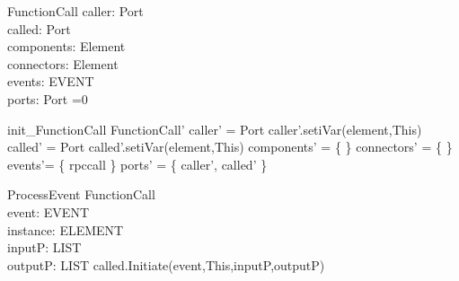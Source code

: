 \begin{schema}{FunctionCall}
caller:  Port \\
called: Port \\
components: \pset Element \\
connectors: \pset Element \\
events: \pset EVENT \\
ports: \pset Port
=0
\end{schema}


\begin{zed}
init\_FunctionCall \sdef \lsch FunctionCall' 
                   \bbar caller' = \new Port 
                   \land caller'.setiVar(element,This) 
                   \land called' = \new Port 
                   \land called'.setiVar(element,This) 
                   \land  components' = \{ \} 
                   \land  connectors' = \{ \} 
                   \land events'= \{ rpccall \} 
                   \land ports' = \{ caller', called' \} \rsch  
                   \end{zed}

\begin{schema}{ProcessEvent}
\Delta FunctionCall \\
event: EVENT \\
instance: ELEMENT \\
inputP: LIST \\
outputP: LIST
\where called.Initiate(event,This,inputP,outputP)
\end{schema}
